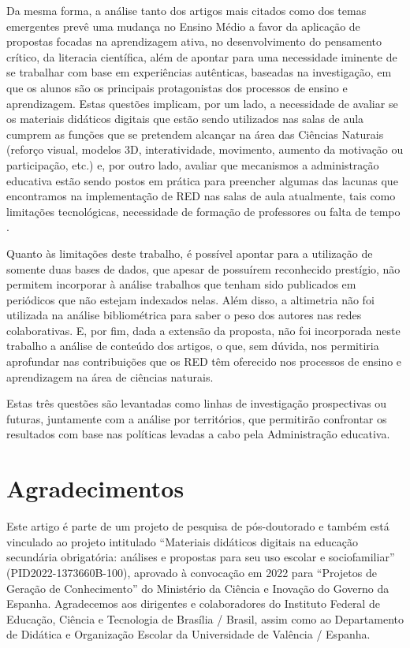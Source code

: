 \documentclass[portuguese]{textolivre}
\begin{document}
Da mesma forma, a análise tanto dos artigos mais citados como dos temas emergentes prevê uma mudança no Ensino Médio a favor da aplicação de propostas focadas na aprendizagem ativa, no desenvolvimento do pensamento crítico, da literacia científica, além de apontar para uma necessidade iminente de se trabalhar com base em experiências autênticas, baseadas na investigação, em que os alunos são os principais protagonistas dos processos de ensino e aprendizagem. Estas questões implicam, por um lado, a necessidade de avaliar se os materiais didáticos digitais que estão sendo utilizados nas salas de aula cumprem as funções que se pretendem alcançar na área das Ciências Naturais (reforço visual, modelos 3D, interatividade, movimento, aumento da motivação ou participação, etc.) e, por outro lado, avaliar que mecanismos a administração educativa estão sendo postos em prática para preencher algumas das lacunas que encontramos na implementação de RED nas salas de aula atualmente, tais como limitações tecnológicas, necessidade de formação de professores ou falta de tempo \cite{vidal_esteve_uso_2019}.

Quanto às limitações deste trabalho, é possível apontar para a utilização de somente duas bases de dados, que apesar de possuírem reconhecido prestígio, não permitem incorporar à análise trabalhos que tenham sido publicados em periódicos que não estejam indexados nelas. Além disso, a altimetria não foi utilizada na análise bibliométrica para saber o peso dos autores nas redes colaborativas. E, por fim, dada a extensão da proposta, não foi incorporada neste trabalho a análise de conteúdo dos artigos, o que, sem dúvida, nos permitiria aprofundar nas contribuições que os RED têm oferecido nos processos de ensino e aprendizagem na área de ciências naturais.

Estas três questões são levantadas como linhas de investigação prospectivas ou futuras, juntamente com a análise por territórios, que permitirão confrontar os resultados com base nas políticas levadas a cabo pela Administração educativa.

\section{Agradecimentos}

Este artigo é parte de um projeto de pesquisa de pós-doutorado e também está vinculado ao projeto intitulado “Materiais didáticos digitais na educação secundária obrigatória: análises e propostas para seu uso escolar e sociofamiliar” (PID2022-1373660B-100), aprovado à convocação em 2022 para “Projetos de Geração de Conhecimento” do Ministério da Ciência e Inovação do Governo da Espanha. Agradecemos aos dirigentes e colaboradores do Instituto Federal de Educação, Ciência e Tecnologia de Brasília / Brasil, assim como ao Departamento de Didática e Organização Escolar da Universidade de Valência / Espanha.
\end{document}
